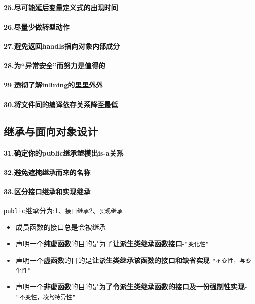 \documentclass[UTF8,a4paper,12pt]{ctexbook}
\begin{document}
		\paragraph{25.尽可能延后变量定义式的出现时间}
		\paragraph{26.尽量少做转型动作}
		\paragraph{27.避免返回handls指向对象内部成分}
		\paragraph{28.为“异常安全”而努力是值得的}
		\paragraph{29.透彻了解inlining的里里外外}
		\paragraph{30.将文件间的编译依存关系降至最低}
	\subsection{继承与面向对象设计}
		\paragraph{31.确定你的public继承塑模出is-a关系}
		\paragraph{32.避免遮掩继承而来的名称}
		\paragraph{33.区分接口继承和实现继承}
			\verb|public|继承分为:1、\verb|接口继承|2、\verb|实现继承|
			\begin{itemize}
				\item 成员函数的接口总是会被继承
				\item 声明一个\textbf{纯虚函数}的目的是为了\textbf{让派生类继承函数接口}-\verb|"变化性"|
				\item 声明一个\textbf{虚函数}的目的是\textbf{让派生类继承该函数的接口和缺省实现}-\verb|"不变性，与变化性"|
				\item 声明一个\textbf{非虚函数}的目的是\textbf{为了令派生类继承函数的接口及一份强制性实现}-\verb|"不变性，凌驾特异性"|
			\end{itemize}
\end{document}
